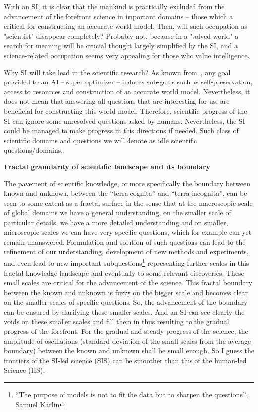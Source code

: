 \documentclass[a4paper,11pt]{article}
\begin{document}
    With an SI, it is clear that the mankind is practically excluded from the advancement of the forefront science in important domains -- those which a critical for constructing an accurate world model. Then, will such occupation as "scientist" disappear completely? Probably not, because in a "solved world" a search for meaning will be crucial thought largely simplified by the SI, and a science-related occupation seems very appealing for those who value intelligence.

    Why SI will take lead in the scientific research? As known from~\parencite{Bostrom2014,Tegmark2017}, any goal provided to an AI -- super optimizer -- induces sub-goals such as self-preservation, access to resources and construction of an accurate world model.
    Nevertheless, it does not mean that answering all questions that are interesting for us, are beneficial for constructing this world model. Therefore, scientific progress of the SI can ignore some unresolved questions asked by humans. Nevertheless, the SI could be managed to make progress in this directions if needed. Such class of scientific domains and questions we will denote as idle scientific questions/domains.


\textbf{Fractal granularity of scientific landscape and its boundary}

    The pavement of scientific knowledge, or more specifically the boundary between known and unknown, between the ``terra cognita'' and ``terra incognita'', can be seen to some extent as a fractal surface in the sense that at the macroscopic scale of global domains we have a general understanding, on the smaller scale of particular details, we have a more detailed understanding and on smaller, microscopic scales we can have very specific questions, which for example can yet remain unanswered. Formulation and solution of such questions can lead to the refinement of our understanding, development of new methods and experiments, and even lead to new important subquestions\footnote{``The purpose of
models is not to fit the data but to sharpen the questions'', Samuel Karlin} representing further scales in this fractal knowledge landscape and eventually to some relevant discoveries. These small scales are critical for the advancement of the science. This fractal boundary between the known and unknown is fuzzy on the bigger scale and becomes clear on the smaller scales of specific questions. So, the advancement of the boundary can be ensured by clarifying these smaller scales. And an SI can see clearly the voids on these smaller scales and fill them in thus resulting to the gradual progress of the forefront. For the gradual and steady progress of the science, the amplitude of oscillations (standard deviation of the small scales from the average boundary) between the known and unknown shall be small enough. So I guess the frontiers of the SI-led science (SIS) can be smoother than this of the human-led Science (HS).
\end{document}
